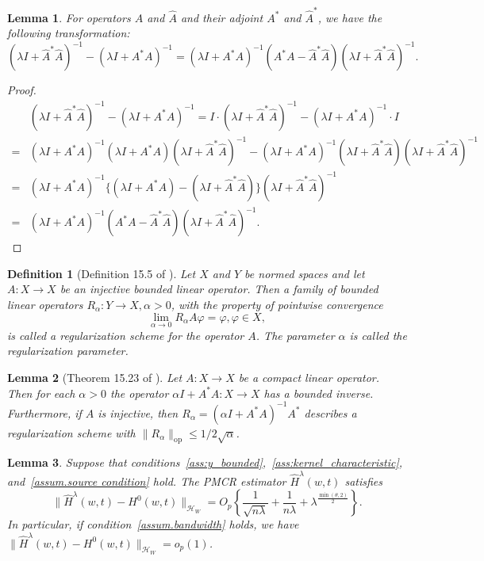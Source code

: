 \documentclass[
  12pt]{article}
\newtheorem{lemma}{Lemma}
\newtheorem{definition}{Definition}
\def\to{\rightarrow}
\begin{document}
\begin{lemma}\label{operator decomposition}
    For operators $A$ and $\widehat{A}$ and their adjoint $A^*$ and $\widehat{A}^*$, we have the following transformation:
       $$
    (\lambda I+\widehat{A}^*\widehat{A})^{-1}-(\lambda I+A^*A)^{-1}=(\lambda I+A^*A)^{-1}( A^*A-\widehat{A}^*\widehat{A})(\lambda I+\widehat{A}^*\widehat{A})^{-1}.
    $$
\end{lemma}
\begin{proof}
\begin{align*}
	&(\lambda I+\widehat{A}^*\widehat{A})^{-1}-(\lambda I+A^*A)^{-1}=I\cdot (\lambda I+\widehat{A}^*\widehat{A})^{-1}-(\lambda I+A^*A)^{-1}\cdot I\\
	=&(\lambda I+A^*A)^{-1}(\lambda I+A^*A)(\lambda I+\widehat{A}^*\widehat{A})^{-1}-(\lambda I+A^*A)^{-1}(\lambda I+\widehat{A}^*\widehat{A})(\lambda I+\widehat{A}^*\widehat{A})^{-1}\\
	=&(\lambda I+A^*A)^{-1}\{ (\lambda I+A^*A)-(\lambda I+\widehat{A}^*\widehat{A}) \} (\lambda I+\widehat{A}^*\widehat{A})^{-1}\\
	=&(\lambda I+A^*A)^{-1}(A^*A-\widehat{A}^*\widehat{A} )(\lambda I+\widehat{A}^*\widehat{A})^{-1}.
\end{align*}
\end{proof}

\begin{definition}[Definition 15.5 of \cite{kress1989linear}]\label{def:regularization-scheme}
Let $X$ and $Y$ be normed spaces and let $A:X\to X$ be an injective bounded linear operator. Then a family of bounded linear operators $R_\alpha : Y\to X,\alpha>0$,  with the property of pointwise convergence
$$
\lim_{\alpha\to 0} R_\alpha A\varphi = \varphi, \varphi\in X,
$$
is called a regularization scheme for the operator $A$. The parameter $\alpha$ is called the
regularization parameter.
\end{definition}
\begin{lemma}[Theorem 15.23 of \cite{kress1989linear}]\label{lem:tikhonov-regularization}
Let $A:X\to X$ be a compact linear operator. Then for each $\alpha>0$ the operator $\alpha I+A^*A: X\to X$ has a bounded inverse. Furthermore, if $A$ is injective, then $R_\alpha = (\alpha I+A^*A)^{-1}A^*$ describes a regularization scheme with $\|R_\alpha\|_{\mathrm{op}}\le 1/2\sqrt{\alpha}$.
\end{lemma}


\begin{lemma}\label{Lem: rates for Hhat - H}
Suppose that conditions~\ref{ass:y_bounded},~\ref{ass:kernel_characteristic}, and~\ref{assum.source condition} hold. The PMCR estimator $\widehat{H}^{\lambda}(w,t)$ satisfies
$$
\|\widehat{H}^{\lambda}(w,t)-H^0(w,t)\|_{\mathcal{H}_{W}}=O_p\left\{ \frac{1}{\sqrt{n\lambda}}+ \frac{1}{n\lambda}+\lambda^{\frac{\min(\theta,2)}{2}}\right\}.
$$
In particular, if condition~\ref{assum.bandwidth} holds, we have $\|\widehat{H}^{\lambda}(w,t)-H^0(w,t)\|_{\mathcal{H}_{W}}=o_p(1)$.
\end{lemma}
\end{document}
